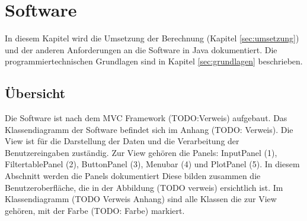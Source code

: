 
\section{Software} \label{sec:software}
In diesem Kapitel wird die Umsetzung der Berechnung (Kapitel \ref{sec:umsetzung}) und der anderen Anforderungen an die Software in Java dokumentiert. Die programmiertechnischen Grundlagen sind in Kapitel \ref{sec:grundlagen} beschrieben.


\subsection{Übersicht} \label{subsec:uebersicht}

Die Software ist nach dem MVC Framework (TODO:Verweis) aufgebaut. Das Klassendiagramm der Software befindet sich im Anhang (TODO: Verweis). Die View ist für die Darstellung der Daten und die Verarbeitung der Benutzereingaben zuständig. Zur View gehören die Panels: InputPanel (1), FiltertablePanel (2), ButtonPanel (3), Menubar (4) und PlotPanel (5). In diesem Abschnitt werden die Panels dokumentiert Diese bilden zusammen die Benutzeroberfläche, die in der Abbildung (TODO verweis) ersichtlich ist. Im Klassendiagramm (TODO Verweis Anhang) sind alle Klassen die zur View gehören, mit der Farbe (TODO: Farbe) markiert.












